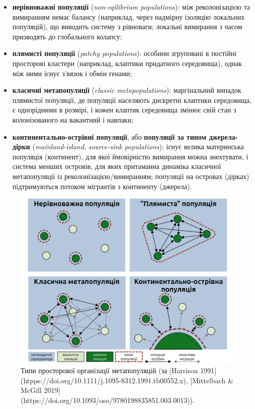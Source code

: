 \documentclass[
  11pt,
]{book}
\begin{document}
\begin{itemize}
\item
  \textbf{нерівноважні популяції} (\emph{non-eqilibrium populations}): між реколонізацією та вимиранням немає балансу (наприклад, через надмірну ізоляцію локальних популяцій), що виводить систему з рівноваги; локальні вимирання з часом призводять до глобального колапсу;
\item
  \textbf{плямисті популяції} (\emph{patchy populations}): особини згруповані в постійні просторові кластери (наприклад, клаптики придатного середовища), однак між ними існує з'вязок і обмін генами;
\item
  \textbf{класичні метапопуляції} (\emph{classic metapopulations}): маргінальний випадок плямистої популяції, де популяції населяють дискретні клаптики середовища, є однорідними в розмірі, і кожен клаптик середовища змінює свій стан з колонізованого на вакантний і навпаки;
\item
  \textbf{континентально-острівні популяції}, або \textbf{популяції за типом джерела-дірки} (\emph{mainland-island}, \emph{source-sink populations}): існує велика материнська популяція (континент), для якої ймовірністю вимирання можна знехтувати, і система менших островів, для яких притаманна динаміка класичної метапопуляції із реколонізацією/вимиранням; популяції на островах (дірках) підтримуються потоком мігрантів з континенту (джерела).
\end{itemize}

\begin{figure}

{\centering \includegraphics[width=46.67in]{images/metapop-types} 

}

\caption{Типи просторової організації метапопуляцій (за [Harrison 1991](htpps://doi.org/10.1111/j.1095-8312.1991.tb00552.x), [Mittelbach & McGill 2019](https://doi.org/10.1093/oso/9780198835851.003.0013)).}\label{fig:fig-metapop-types}
\end{figure}
\end{document}

